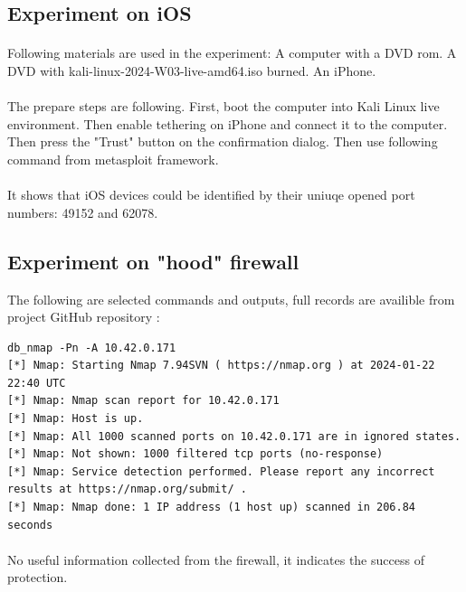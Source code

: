 \documentclass[mscthesis]{usiinfthesis}
\begin{document}
\subsection{Experiment on iOS}
\paragraph{}
Following materials are used in the experiment: A computer with a DVD rom. A DVD with kali-linux-2024-W03-live-amd64.iso burned. An iPhone.
\paragraph{}
The prepare steps are following. First, boot the computer into Kali Linux live environment. Then enable tethering on iPhone and connect it to the computer. Then press the "Trust" button on the confirmation dialog. Then use following command from metasploit framework.

\paragraph{}
It shows that iOS devices could be identified by their uniuqe opened port numbers: 49152 and 62078.

\subsection{Experiment on "hood" firewall}
The following are selected commands and outputs, full records are availible from project GitHub repository \citep{hood:github}:

\begin{lstlisting}[language={},breaklines=true,postbreak=\mbox{\textcolor{red}{$\hookrightarrow$}\space}]
db_nmap -Pn -A 10.42.0.171
[*] Nmap: Starting Nmap 7.94SVN ( https://nmap.org ) at 2024-01-22 22:40 UTC
[*] Nmap: Nmap scan report for 10.42.0.171
[*] Nmap: Host is up.
[*] Nmap: All 1000 scanned ports on 10.42.0.171 are in ignored states.
[*] Nmap: Not shown: 1000 filtered tcp ports (no-response)
[*] Nmap: Service detection performed. Please report any incorrect results at https://nmap.org/submit/ .
[*] Nmap: Nmap done: 1 IP address (1 host up) scanned in 206.84 seconds
\end{lstlisting}
\paragraph{}
No useful information collected from the firewall, it indicates the success of protection.
\end{document}
